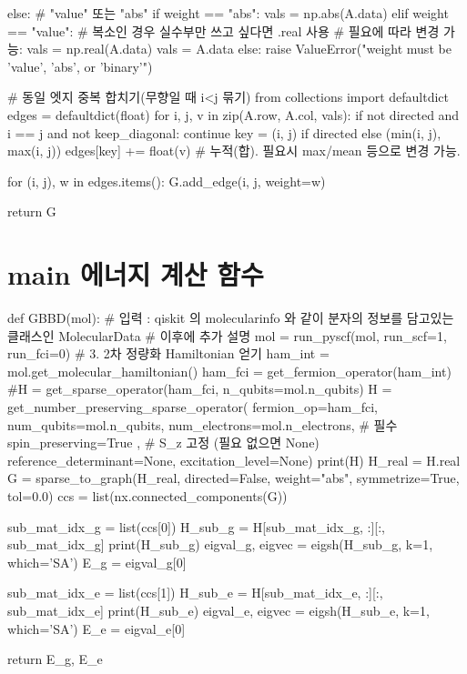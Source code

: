 \documentclass[11pt]{article}
\begin{document}
\begin{CodeBox}[title={Example: Python snippet}]
    else:
        # "value" 또는 "abs"
        if weight == "abs":
            vals = np.abs(A.data)
        elif weight == "value":
            # 복소인 경우 실수부만 쓰고 싶다면 .real 사용
            # 필요에 따라 변경 가능: vals = np.real(A.data)
            vals = A.data
        else:
            raise ValueError("weight must be 'value', 'abs', or 'binary'")

        # 동일 엣지 중복 합치기(무향일 때 i<j 묶기)
        from collections import defaultdict
        edges = defaultdict(float)
        for i, j, v in zip(A.row, A.col, vals):
            if not directed and i == j and not keep_diagonal:
                continue
            key = (i, j) if directed else (min(i, j), max(i, j))
            edges[key] += float(v)  # 누적(합). 필요시 max/mean 등으로 변경 가능.

        for (i, j), w in edges.items():
            G.add_edge(i, j, weight=w)

    return G
\end{CodeBox}

\section{main 에너지 계산 함수}

\begin{CodeBox}[title={Example: Python snippet}]
def GBBD(mol):
  # 입력 : qiskit 의 molecularinfo 와 같이 분자의 정보를 담고있는 클래스인 MolecularData
  # 이후에 추가 설명
  mol = run_pyscf(mol, run_scf=1, run_fci=0)
  # 3. 2차 정량화 Hamiltonian 얻기
  ham_int = mol.get_molecular_hamiltonian()
  ham_fci = get_fermion_operator(ham_int)     
  #H = get_sparse_operator(ham_fci, n_qubits=mol.n_qubits)
  H = get_number_preserving_sparse_operator(
  fermion_op=ham_fci,
  num_qubits=mol.n_qubits,
  num_electrons=mol.n_electrons,       # 필수
  spin_preserving=True ,        # S_z 고정 (필요 없으면 None)
  reference_determinant=None,
  excitation_level=None)
  print(H)
  H_real = H.real
  G = sparse_to_graph(H_real, directed=False, weight="abs", symmetrize=True, tol=0.0)
  ccs = list(nx.connected_components(G))
  
  sub_mat_idx_g = list(ccs[0])
  H_sub_g = H[sub_mat_idx_g, :][:, sub_mat_idx_g]
  print(H_sub_g)
  eigval_g, eigvec = eigsh(H_sub_g, k=1, which='SA')
  E_g = eigval_g[0]
  
  sub_mat_idx_e = list(ccs[1])
  H_sub_e = H[sub_mat_idx_e, :][:, sub_mat_idx_e]
  print(H_sub_e)
  eigval_e, eigvec = eigsh(H_sub_e, k=1, which='SA')
  E_e = eigval_e[0]
  
  return E_g, E_e
\end{CodeBox}
\end{document}
